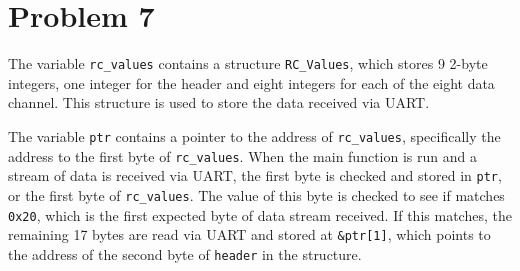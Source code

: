 \section*{Problem 7}
The variable \texttt{rc\_values} contains a structure \texttt{RC\_Values}, which stores 9 2-byte integers, one integer for the header and eight integers for each of the eight data channel. This structure is used to store the data received via UART.

The variable \texttt{ptr} contains a pointer to the address of \texttt{rc\_values}, specifically the address to the first byte of \texttt{rc\_values}. When the main function is run and a stream of data is received via UART, the first byte is checked and stored in \texttt{ptr}, or the first byte of \texttt{rc\_values}. The value of this byte is checked to see if matches \texttt{0x20}, which is the first expected byte of data stream received. If this matches, the remaining 17 bytes are read via UART and stored at \texttt{\&ptr[1]}, which points to the address of the second byte of \texttt{header} in the structure.